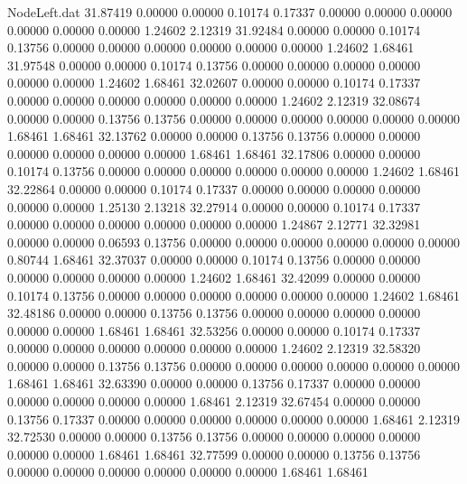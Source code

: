 \begin{filecontents}{NodeLeft.dat}
  31.87419    0.00000    0.00000     0.10174    0.17337    0.00000    0.00000    0.00000    0.00000    0.00000    0.00000    1.24602    2.12319
  31.92484    0.00000    0.00000     0.10174    0.13756    0.00000    0.00000    0.00000    0.00000    0.00000    0.00000    1.24602    1.68461
  31.97548    0.00000    0.00000     0.10174    0.13756    0.00000    0.00000    0.00000    0.00000    0.00000    0.00000    1.24602    1.68461
  32.02607    0.00000    0.00000     0.10174    0.17337    0.00000    0.00000    0.00000    0.00000    0.00000    0.00000    1.24602    2.12319
  32.08674    0.00000    0.00000     0.13756    0.13756    0.00000    0.00000    0.00000    0.00000    0.00000    0.00000    1.68461    1.68461
  32.13762    0.00000    0.00000     0.13756    0.13756    0.00000    0.00000    0.00000    0.00000    0.00000    0.00000    1.68461    1.68461
  32.17806    0.00000    0.00000     0.10174    0.13756    0.00000    0.00000    0.00000    0.00000    0.00000    0.00000    1.24602    1.68461
  32.22864    0.00000    0.00000     0.10174    0.17337    0.00000    0.00000    0.00000    0.00000    0.00000    0.00000    1.25130    2.13218
  32.27914    0.00000    0.00000     0.10174    0.17337    0.00000    0.00000    0.00000    0.00000    0.00000    0.00000    1.24867    2.12771
  32.32981    0.00000    0.00000     0.06593    0.13756    0.00000    0.00000    0.00000    0.00000    0.00000    0.00000    0.80744    1.68461
  32.37037    0.00000    0.00000     0.10174    0.13756    0.00000    0.00000    0.00000    0.00000    0.00000    0.00000    1.24602    1.68461
  32.42099    0.00000    0.00000     0.10174    0.13756    0.00000    0.00000    0.00000    0.00000    0.00000    0.00000    1.24602    1.68461
  32.48186    0.00000    0.00000     0.13756    0.13756    0.00000    0.00000    0.00000    0.00000    0.00000    0.00000    1.68461    1.68461
  32.53256    0.00000    0.00000     0.10174    0.17337    0.00000    0.00000    0.00000    0.00000    0.00000    0.00000    1.24602    2.12319
  32.58320    0.00000    0.00000     0.13756    0.13756    0.00000    0.00000    0.00000    0.00000    0.00000    0.00000    1.68461    1.68461
  32.63390    0.00000    0.00000     0.13756    0.17337    0.00000    0.00000    0.00000    0.00000    0.00000    0.00000    1.68461    2.12319
  32.67454    0.00000    0.00000     0.13756    0.17337    0.00000    0.00000    0.00000    0.00000    0.00000    0.00000    1.68461    2.12319
  32.72530    0.00000    0.00000     0.13756    0.13756    0.00000    0.00000    0.00000    0.00000    0.00000    0.00000    1.68461    1.68461
  32.77599    0.00000    0.00000     0.13756    0.13756    0.00000    0.00000    0.00000    0.00000    0.00000    0.00000    1.68461    1.68461

\end{filecontents}
